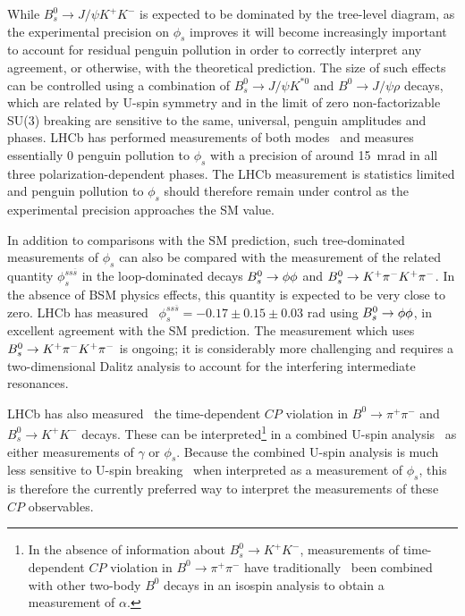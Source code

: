 While $B^0_s \to J/\psi K^+ K^-$ is expected to be dominated by the tree-level diagram,
as the experimental precision on $\phi_s$ improves it will become increasingly important
to account for residual penguin pollution in order to correctly interpret any agreement,
or otherwise, with the theoretical prediction. The size of such effects can be controlled
using a combination of $B^0_s \to J/\psi K^{*0}$ and $B^0 \to J/\psi \rho$ decays,
which are related by U-spin symmetry and in the limit of zero non-factorizable SU(3)
breaking are sensitive to the same, universal, penguin amplitudes and phases.
LHCb has performed measurements of both modes~\cite{LHCb-PAPER-2015-034,LHCb-PAPER-2014-058} and
measures essentially $0$ penguin pollution to $\phi_s$ with a precision of around 15~mrad
in all three polarization-dependent phases. The LHCb measurement is statistics limited
and penguin pollution to $\phi_s$ should therefore
remain under control as the experimental precision approaches the SM value.

In addition to comparisons with the SM prediction, such tree-dominated measurements of $\phi_s$ can also be compared with the measurement
of the related quantity $\phi_s^{ss\overline{s}}$ in the loop-dominated decays ${{B}^0_{s}} \rightarrow \phi\phi$ and ${{B}^0_{s}}\rightarrow {\ensuremath{{K}^+}}\pi^-{{K}^+}\pi^-$.
In the absence of BSM physics effects, this quantity is expected to be very close to zero.
LHCb has measured~\cite{LHCb-PAPER-2014-026} $\phi_s^{ss\overline{s}} = -0.17 \pm 0.15 \pm 0.03$ rad using
${{B}^0_{s}}\rightarrow \phi\phi$, in excellent agreement with the SM prediction. The measurement
which uses ${{B}^0_{s}}\rightarrow {\ensuremath{{K}^+}}\pi^-{{K}^+}\pi^-$ is ongoing; it is considerably more challenging and
requires a two-dimensional Dalitz analysis to account
for the interfering intermediate resonances. 

LHCb has also measured~\cite{LHCb:2017ood} the time-dependent $CP$ violation in $B^0 \to \pi^+ \pi^-$ and $B^0_s \to K^+ K^-$ decays.
These can be interpreted\footnote{In the absence of information about $B^0_s \to K^+ K^-$, measurements of time-dependent $CP$ violation in
$B^0 \to \pi^+ \pi^-$ have traditionally~\cite{HFAG} been combined with other two-body $B^0$ decays in an isospin analysis to obtain a measurement of $\alpha$.}
in a combined U-spin analysis~\cite{Fleischer:1999pa} as either measurements of $\gamma$ or $\phi_s$.
Because the combined U-spin analysis is much less sensitive
to U-spin breaking~\cite{LHCb-PAPER-2014-045} when interpreted as a measurement of $\phi_s$, this is therefore the currently preferred way
to interpret the measurements of these $CP$ observables.

